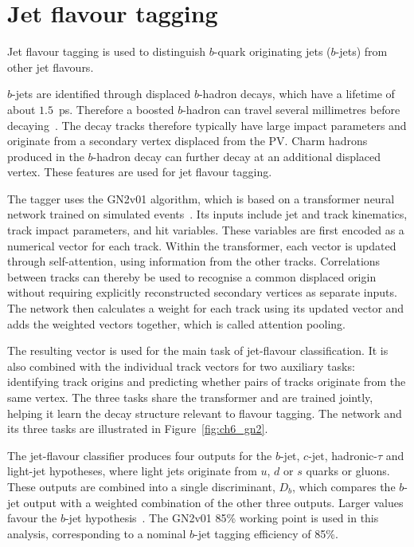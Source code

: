 \section{Jet flavour tagging}
\label{sec:ch6_btag}

Jet flavour tagging is used to distinguish $b$-quark originating jets ($b$-jets) from other jet flavours.

$b$-jets are identified through displaced $b$-hadron decays, which have a lifetime of about $1.5$~ps. Therefore a boosted $b$-hadron can travel several millimetres before decaying~\cite{ATLAS2026GN2}.
The decay tracks therefore typically have large impact parameters and originate from a secondary vertex displaced from the PV.
Charm hadrons produced in the $b$-hadron decay can further decay at an additional displaced vertex.
These features are used for jet flavour tagging.

The tagger uses the GN2v01 algorithm, which is based on a transformer neural network trained on simulated events~\cite{ATLAS2026GN2}.
Its inputs include jet and track kinematics, track impact parameters, and hit variables.
These variables are first encoded as a numerical vector for each track.
Within the transformer, each vector is updated through self-attention, using information from the other tracks.
Correlations between tracks can thereby be used to recognise a common displaced origin without requiring explicitly reconstructed secondary vertices as separate inputs.
The network then calculates a weight for each track using its updated vector and adds the weighted vectors together, which is called attention pooling.

The resulting vector is used for the main task of jet-flavour classification.
It is also combined with the individual track vectors for two auxiliary tasks: identifying track origins and predicting whether pairs of tracks originate from the same vertex.
The three tasks share the transformer and are trained jointly, helping it learn the decay structure relevant to flavour tagging.
The network and its three tasks are illustrated in Figure~\ref{fig:ch6_gn2}.

The jet-flavour classifier produces four outputs for the $b$-jet, $c$-jet, hadronic-$\tau$ and light-jet hypotheses, where light jets originate from $u$, $d$ or $s$ quarks or gluons.
These outputs are combined into a single discriminant, $D_b$, which compares the $b$-jet output with a weighted combination of the other three outputs.
Larger values favour the $b$-jet hypothesis~\cite{ATLAS2026GN2}.
The GN2v01 85\% working point is used in this analysis, corresponding to a nominal $b$-jet tagging efficiency of 85\%.

